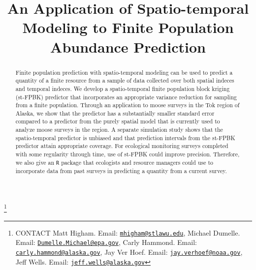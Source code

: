 \documentclass[]{interact}
\theoremstyle{plain}%
\theoremstyle{definition}
\theoremstyle{remark}
\begin{document}

\title{An Application of Spatio-temporal Modeling to Finite Population
Abundance Prediction}


\author{
}

\thanks{CONTACT Matt
Higham. Email: \href{mailto:mhigham@stlawu.edu}{\nolinkurl{mhigham@stlawu.edu}}, Michael
Dumelle. Email: \href{mailto:Dumelle.Michael@epa.gov}{\nolinkurl{Dumelle.Michael@epa.gov}}, Carly
Hammond. Email: \href{mailto:carly.hammond@alaska.gov}{\nolinkurl{carly.hammond@alaska.gov}}, Jay
Ver
Hoef. Email: \href{mailto:jay.verhoef@noaa.gov}{\nolinkurl{jay.verhoef@noaa.gov}}, Jeff
Wells. Email: \href{mailto:jeff.wells@alaska.gov}{\nolinkurl{jeff.wells@alaska.gov}}}

\maketitle

\begin{abstract}
Finite population prediction with spatio-temporal modeling can be used
to predict a quantity of a finite resource from a sample of data
collected over both spatial indeces and temporal indeces. We develop a
spatio-temporal finite population block kriging (st-FPBK) predictor that
incorporates an appropriate variance reduction for sampling from a
finite population. Through an application to moose surveys in the Tok
region of Alaska, we show that the predictor has a substantially smaller
standard error compared to a predictor from the purely spatial model
that is currently used to analyze moose surveys in the region. A
separate simulation study shows that the spatio-temporal predictor is
unbiased and that prediction intervals from the st-FPBK predictor attain
appropriate coverage. For ecological monitoring surveys completed with
some regularity through time, use of st-FPBK could improve precision.
Therefore, we also give an \texttt{R} package that ecologists and
resource managers could use to incorporate data from past surveys in
predicting a quantity from a current survey.
\end{abstract}
\end{document}
